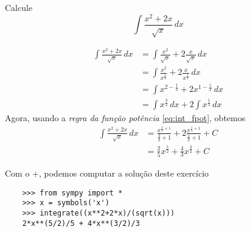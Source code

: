 \begin{exeresol}
  Calcule
  \begin{equation}
    \int \frac{x^2+2x}{\sqrt{x}}\,dx
  \end{equation}
\end{exeresol}
\begin{resol}
  \begin{align}
    \int \frac{x^2+2x}{\sqrt{x}}\,dx &= \int \frac{x^2}{\sqrt{x}} + 2\frac{x}{\sqrt{x}}\,dx\\
                                     &= \int \frac{x^2}{x^{\frac{1}{2}}} + 2\frac{x}{x^{\frac{1}{2}}}\,dx\\
                                     &= \int x^{2-\frac{1}{2}} + 2x^{1-\frac{1}{2}}\,dx\\
                                     &= \int x^{\frac{3}{2}}\,dx + 2\int x^{\frac{1}{2}}\,dx
  \end{align}
  Agora, usando a \emph{regra da função potência} \eqref{eq:int_fpot}, obtemos
  \begin{align}
    \int \frac{x^2+2x}{\sqrt{x}}\,dx &= \frac{x^{\frac{3}{2}+1}}{\frac{3}{2}+1} + 2\frac{x^{\frac{1}{2}+1}}{\frac{1}{2}+1} + C\\
                                     &= \frac{2}{5}x^{\frac{5}{2}} + \frac{4}{3}x^{\frac{3}{2}} + C
  \end{align}

  \ifispython
  Com o {\python}+{\sympy}, podemos computar a solução deste exercício
  \begin{lstlisting}
    >>> from sympy import *
    >>> x = symbols('x')
    >>> integrate((x**2+2*x)/(sqrt(x)))
    2*x**(5/2)/5 + 4*x**(3/2)/3
  \end{lstlisting}
  \fi
\end{resol}

  
